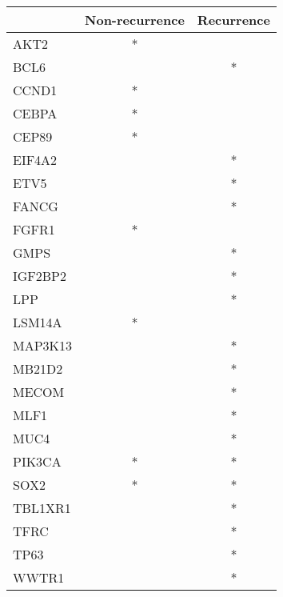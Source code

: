\begin{tabular}{lcc}
\toprule
{} & Non-recurrence & Recurrence \\
\midrule
AKT2    &              * &            \\
BCL6    &                &          * \\
CCND1   &              * &            \\
CEBPA   &              * &            \\
CEP89   &              * &            \\
EIF4A2  &                &          * \\
ETV5    &                &          * \\
FANCG   &                &          * \\
FGFR1   &              * &            \\
GMPS    &                &          * \\
IGF2BP2 &                &          * \\
LPP     &                &          * \\
LSM14A  &              * &            \\
MAP3K13 &                &          * \\
MB21D2  &                &          * \\
MECOM   &                &          * \\
MLF1    &                &          * \\
MUC4    &                &          * \\
PIK3CA  &              * &          * \\
SOX2    &              * &          * \\
TBL1XR1 &                &          * \\
TFRC    &                &          * \\
TP63    &                &          * \\
WWTR1   &                &          * \\
\bottomrule
\end{tabular}
